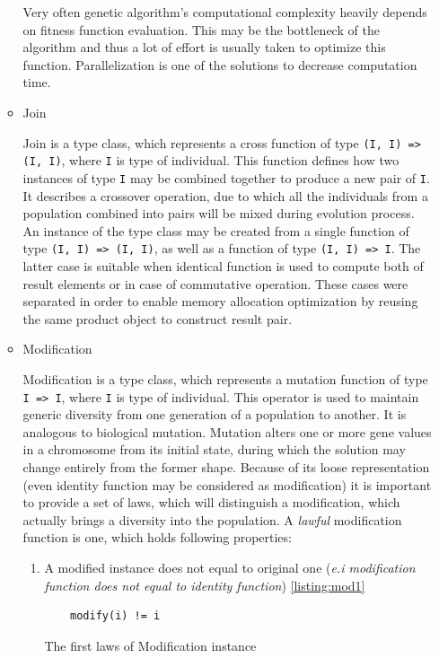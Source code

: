 \begin{itemize}
\begin{itemize}
Very often genetic algorithm's computational complexity heavily depends on fitness function evaluation. This may be the bottleneck of the algorithm and thus a lot of effort is usually taken to optimize this function. Parallelization is one of the solutions to decrease computation time.
\medbreak	

\item
Join

Join is a type class, which represents a cross function of type \texttt{(I, I) => (I, I)}, where \texttt{I} is type of individual. This function defines how two instances of type \texttt{I} may be combined together to produce a new pair of \texttt{I}. It describes a crossover operation, due to which all the individuals from a population combined into pairs will be mixed during evolution process. An instance of the type class may be created from a single function of type \texttt{(I, I) => (I, I)}, as well as a function of type \texttt{(I, I) => I}. The latter case is suitable when identical function is used to compute both of result elements or in case of commutative operation. These cases were separated in order to enable memory allocation optimization by reusing the same product object to construct result pair.
\medbreak

\item
Modification

Modification is a type class, which represents a mutation function of type \texttt{I => I}, where \texttt{I} is type of individual. This operator is used to maintain generic diversity from one generation of a population to another. It is analogous to biological mutation. Mutation alters one or more gene values in a chromosome from its initial state, during which the solution may change entirely from the former shape. Because of its loose representation (even identity function may be considered as modification) it is important to provide a set of laws, which will distinguish a modification, which actually brings a diversity into the population. A \textit{lawful} modification function is one, which holds following properties:

\begin{enumerate}
\item
A modified instance does not equal to original one (\textit{e.i modification function does not equal to identity function}) \ref{listing:mod1}

\begin{listing}
\begin{verbatim}
	modify(i) != i
\end{verbatim}
\caption{The first laws of Modification instance} \label{listing:mod1}
\end{listing}


\end{enumerate}
\end{itemize}
\end{itemize}

